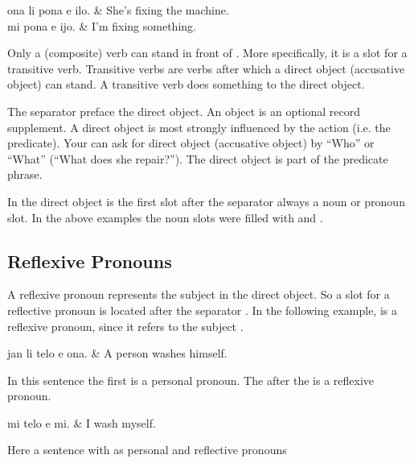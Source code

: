 \begin{translationtable}
    ona li pona e ilo. & She's fixing the machine. \\
    mi pona e ijo.     & I'm fixing something.     \\
\end{translationtable}
%
Only a (composite) verb can stand in front of .
More specifically, it is a slot for a transitive verb.
Transitive verbs are verbs after which a direct object (accusative object) can stand.
A transitive verb does something to the direct object.

The separator  preface the direct object.
An object is an optional record supplement.
A direct object is most strongly influenced by the action (i.e\@. the predicate).
Your can ask for direct object (accusative object) by ``Who'' or ``What'' (``What does she repair?'').
The direct object is part of the predicate phrase.

In the direct object is the first slot after the separator  always a noun or pronoun slot.
In the above examples the noun slots were filled with  and .

\subsection*{Reflexive Pronouns}
A reflexive pronoun represents the subject in the direct object.
So a slot for a reflective pronoun is located after the separator .
In the following example,  is a reflexive pronoun, since it refers to the subject .

\begin{translationtable}
    jan li telo e ona. & A person washes himself. \\
\end{translationtable}
%
In this sentence the first  is a personal pronoun.
The  after the  is a reflexive pronoun.

\begin{translationtable}
    mi telo e mi. & I wash myself. \\
\end{translationtable}
%
Here a sentence with  as personal and reflective pronouns

